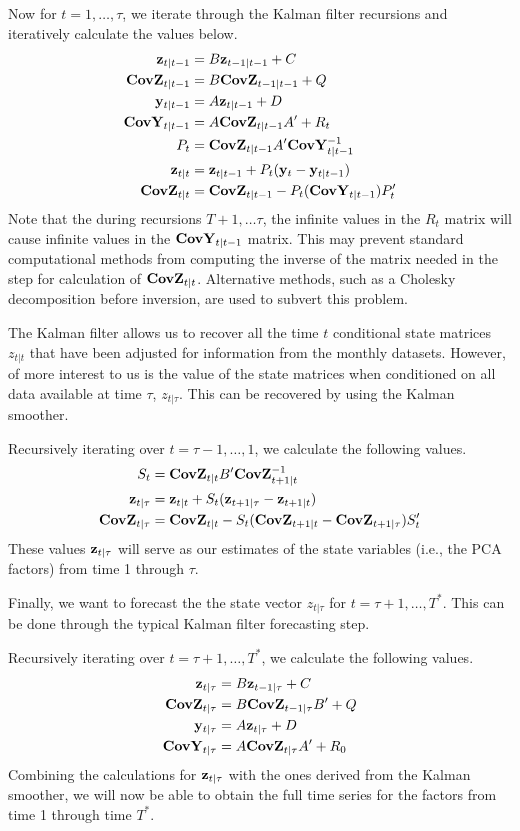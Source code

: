 \documentclass[11pt, letterpaper]{article}\usepackage[]{graphicx}\usepackage[]{color}
\newcommand{\vv}[1]{\textcolor{black}{\mathbf{#1}}}
\begin{document}
Now for $t = 1, \dots, \tau$, we iterate through the Kalman filter recursions and iteratively calculate the values below.
\begin{align*}
	\vv{z}_{t|t-1} &= B \vv{z}_{t-1|t-1} + C\\
	\vv{CovZ}_{t|t-1} &= B \vv{CovZ}_{t-1|t-1} + Q\\
	\vv{y}_{t|t-1} &= A \vv{z}_{t|t-1} + D\\
	\vv{CovY}_{t|t-1} &= A \vv{CovZ}_{t|t-1} A' + R_t\\
	P_t &= \vv{CovZ}_{t|t-1} A' \vv{CovY}^{-1}_{t|t-1}\\
	\vv{z}_{t|t} &= \vv{z}_{t|t-1} + P_t (\vv{y}_t - \vv{y}_{t|t-1})\\
	\vv{CovZ}_{t|t} &= \vv{CovZ}_{t|t-1} - P_t (\vv{CovY}_{t|t-1}) P'_t
\end{align*}
Note that the during recursions $T + 1, \dots \tau$, the infinite values in the $R_t$ matrix will cause infinite values in the $\vv{CovY}_{t|t-1}$ matrix. This may prevent standard computational methods from computing the inverse of the matrix needed in the step for calculation of $\vv{CovZ}_{t|t}$. Alternative methods, such as a Cholesky decomposition before inversion, are used to subvert this problem.

The Kalman filter allows us to recover all the time $t$ conditional state matrices $z_{t|t}$ that have been adjusted for information from the monthly datasets. However, of more interest to us is the value of the state matrices when conditioned on all data available at time $\tau$, $z_{t|\tau}$. This can be recovered by using the Kalman smoother.

Recursively iterating over $t = \tau - 1, \dots, 1$, we calculate the following values. 
\begin{align*}
	S_{t} &= \vv{CovZ}_{t|t} B' \vv{CovZ}^{-1}_{t + 1|t}\\
	\vv{z}_{t|\tau} &= \vv{z}_{t|t} + S_t (\vv{z}_{t+1|\tau} - \vv{z}_{t + 1|t})\\
	\vv{CovZ}_{t|\tau} &= \vv{CovZ}_{t|t} - S_t(\vv{CovZ}_{t + 1|t} - \vv{CovZ}_{t + 1|\tau})S'_t
\end{align*}
These values $\vv{z}_{t|\tau}$ will serve as our estimates of the state variables (i.e., the PCA factors) from time 1 through $\tau$.

Finally, we want to forecast the the state vector $z_{t|\tau}$ for $t = \tau + 1, \dots, T^*$. This can be done through the typical Kalman filter forecasting step.

Recursively iterating over $t = \tau + 1, \dots, T^*$, we calculate the following values.
\begin{align*}
	\vv{z}_{t|\tau} &= B \vv{z}_{t-1|\tau} + C\\
	\vv{CovZ}_{t|\tau} &= B \vv{CovZ}_{t-1|\tau} B'+ Q\\
	\vv{y}_{t|\tau} &= A \vv{z}_{t|\tau} + D\\
	\vv{CovY}_{t|\tau} &= A \vv{CovZ}_{t|\tau} A' + R_0
\end{align*}
Combining the calculations for $\vv{z}_{t|\tau}$ with the ones derived from the Kalman smoother, we will now be able to obtain the full time series for the factors from time 1 through time $T^*$.
\end{document}
